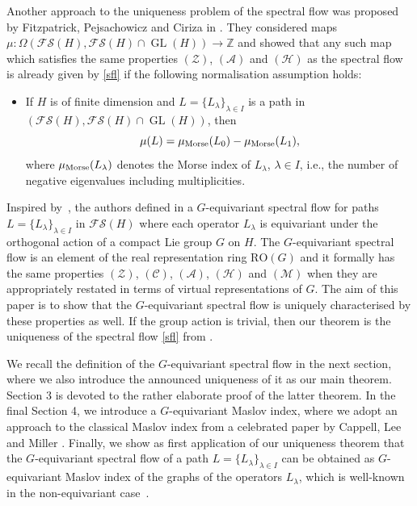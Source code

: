 \documentclass[pdftex]{sigma}
\numberwithin{equation}{section}
\theoremstyle{definition}
\DeclareMathOperator{\GL}{GL}
\begin{document}
Another approach to the uniqueness problem of the spectral flow was proposed by Fitzpatrick, Pejsachowicz and Ciriza in \cite{JacoboUniqueness}. They considered maps $\mu \colon \Omega(\mathcal{FS}(H),\mathcal{FS}(H)\cap\GL(H))\rightarrow\mathbb{Z}$ and showed that any such map which satisfies the same properties $(\mathcal{Z})$, $(\mathcal{A})$ and $(\mathcal{H})$ as the spectral flow is already given by \eqref{sfl} if the following normalisation assumption holds:
\begin{itemize}\itemsep=0pt
\item[$\mathcal{(M)}$] If $H$ is of finite dimension and $L=\{L_\lambda\}_{\lambda\in I}$ is a path in $(\mathcal{FS}(H),\mathcal{FS}(H)\cap\GL(H))$, then
\[\mu(L)=\mu_{\rm Morse}(L_0)-\mu_{\rm Morse}(L_1),\]
where $\mu_{\rm Morse}(L_\lambda)$ denotes the Morse index of $L_\lambda$, $\lambda\in I$, i.e., the number of negative eigenvalues including multiplicities.
\end{itemize}
Inspired by~\cite{Fang}, the authors defined in \cite{MJN21} a $G$-equivariant spectral flow for paths $L=\{L_\lambda\}_{\lambda\in I}$ in $\mathcal{FS}(H)$ where each operator $L_\lambda$ is equivariant under the orthogonal action of a compact Lie group $G$ on $H$. The $G$-equivariant spectral flow is an element of the real representation ring $\mathrm{RO}(G)$ and it formally has the same properties $(\mathcal{Z})$, $(\mathcal{C})$, $(\mathcal{A})$, $(\mathcal{H})$ and $(\mathcal{M})$ when they are appropriately restated in terms of virtual representations of $G$. The aim of this paper is to show that the $G$-equivariant spectral flow is uniquely characterised by these properties as well. If the group action is trivial, then our theorem is the uniqueness of the spectral flow \eqref{sfl} from \cite{JacoboUniqueness}.

We recall the definition of the $G$-equivariant spectral flow in the next section, where we also introduce the announced uniqueness of it as our main theorem. Section 3 is devoted to the rather elaborate proof of the latter theorem. In the final Section 4, we introduce a $G$-equivariant Maslov index, where we adopt an approach to the classical Maslov index from a celebrated paper by Cappell, Lee and Miller \cite{Cappell}. Finally, we show as first application of our uniqueness theorem that the $G$-equivariant spectral flow of a path $L=\{L_\lambda\}_{\lambda\in I}$ can be obtained as $G$-equivariant Maslov index of the graphs of the operators $L_\lambda$, which is well-known in the non-equivariant case~\cite{CompSfl}.
\end{document}
